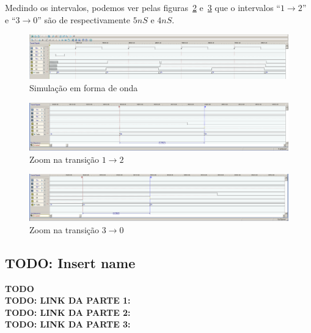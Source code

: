 \documentclass[12pt]{article}
\begin{document}
Medindo os intervalos, podemos ver pelas figuras~\ref{fig:2.1.3.wave.2.1.png}
e~\ref{fig:2.1.3.wave.2.2.png} que o intervalos ``$1 \rightarrow 2$'' e
``$3 \rightarrow 0$'' são de respectivamente $5nS$ e $4nS$.

\begin{figure}[H]
  \centering
  \includegraphics[width=1\textwidth]{Exp09/images/2.1.3.wave.1.png}
  \caption{Simulação em forma de onda}\label{fig:2.1.3.wave.1.png}
\end{figure}

\begin{figure}[H]
  \centering
  \includegraphics[width=1\textwidth]{Exp09/images/2.1.3.wave.2.1.png}
  \caption{Zoom na transição $1 \rightarrow 2$}\label{fig:2.1.3.wave.2.1.png}
\end{figure}

\begin{figure}[H]
  \centering
  \includegraphics[width=1\textwidth]{Exp09/images/2.1.3.wave.2.2.png}
  \caption{Zoom na transição $3 \rightarrow 0$}\label{fig:2.1.3.wave.2.2.png}
\end{figure}


\subsection{TODO: Insert name}\label{sec:2.4}

\textbf{TODO}\\
\textbf{TODO: LINK DA PARTE 1:}\\
\href{}{}
\textbf{TODO: LINK DA PARTE 2:}\\
\href{}{}
\textbf{TODO: LINK DA PARTE 3:}\\
\href{}{}
\end{document}
